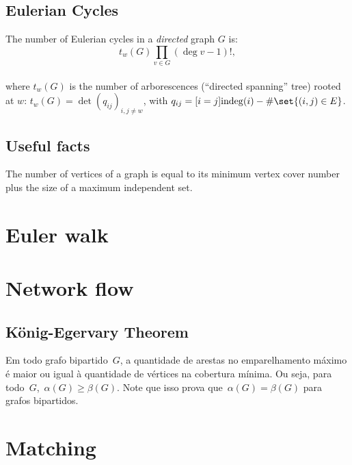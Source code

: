 \subsection{Eulerian Cycles}
The number of Eulerian cycles in a \emph{directed} graph $G$ is:
		\begin{equation*}
			t_w(G) \prod_{v \in G} (\deg v - 1)!,
		\end{equation*}\\
		where $t_w(G)$ is the number of arborescences (``directed spanning'' tree) rooted at $w$: $t_w(G) = \det\left( q_{ij} \right)_{i,j \neq w}$, with $q_{ij} = [i=j] \mathrm{indeg}(i) - \# \set{(i,j) \in E}$.\newline
	
\subsection{Useful facts}
The number of vertices of a graph is equal to its minimum vertex cover number plus the size of a maximum independent set.\\

\section{Euler walk}

\section{Network flow}
    \newline    
    \subsection{König-Egervary Theorem}
    Em todo grafo bipartido~$G$, a quantidade de arestas no emparelhamento máximo é maior ou igual à quantidade de vértices na cobertura mínima. Ou seja, para todo~$G$,~$\alpha(G) \geq \beta(G)$. Note que isso prova que~$\alpha(G) = \beta(G)$ para grafos bipartidos. 
    
  
\section{Matching}
	

